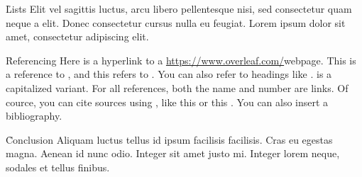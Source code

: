 \documentclass[twocolumn]{paper}
\begin{document}
\h{Lists}
Elit vel sagittis luctus, arcu libero pellentesque nisi, sed consectetur quam neque a elit. Donec consectetur cursus nulla eu feugiat. Lorem ipsum dolor sit amet, consectetur adipiscing elit.


\h{Referencing}
Here is a hyperlink to a \url{https://www.overleaf.com/}{webpage}. This is a reference to , and this refers to . You can also refer to headings like .  is a capitalized variant. For all references, both the name and number are links. Of cource, you can cite sources using \c{\cite{...}}, like this \cite{minted} or this \cite{tabularray}. You can also insert a bibliography.

\h{Conclusion}
Aliquam luctus tellus id ipsum facilisis facilisis. Cras eu egestas magna. Aenean id nunc odio. Integer sit amet justo mi. Integer lorem neque, sodales et tellus finibus.

\toc

\end{document}
